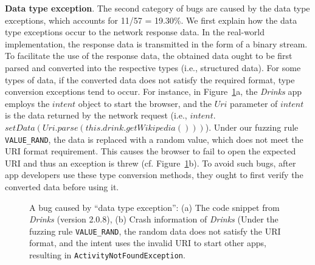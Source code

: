 \documentclass[sigconf,review, anonymous]{acmart}
\begin{document}
\textbf{Data type exception}. The second category of bugs are caused by the data type exceptions, which accounts for 11/57 = 19.30\%. We first explain how the data type exceptions occur to the network response data. In the real-world implementation, the response data is transmitted in the form of a binary stream. To facilitate the use of the response data,  the obtained data ought to be first parsed and converted into the respective types (i.e., structured data). For some types of data, if the converted data does not satisfy the required format, type conversion exceptions tend to occur. For instance, in Figure~\ref{fig_bug2}a, the \textit{Drinks} app employs the $intent$ object to start the browser, and the $Uri$ parameter of $intent$ is the data returned by the network request (i.e., $intent$. $setData(Uri. parse(this.drink.getWikipedia()))$). Under our fuzzing rule \texttt{VALUE\_RAND}, the data is replaced with a random value, which does not meet the URI format requirement. This causes the browser to fail to open the expected URI and thus an exception is threw (cf. Figure~\ref{fig_bug2}b). To avoid such bugs, after app developers use these type conversion methods, they ought to first verify the converted data before using it.

\begin{figure}
  \centering
 \subfigure[]{
    }
  \subfigure[]{
    }
  \caption{A bug caused by ``data type exception'': (a) The code snippet from \textit{Drinks} (version 2.0.8), (b) Crash information of \textit{Drinks} (Under the fuzzing rule \texttt{VALUE\_RAND}, the random data does not satisfy the URI format, and the intent uses the invalid URI to start other apps, resulting in \texttt{ActivityNotFoundException}.}
\label{fig_bug2}
\end{figure}
\end{document}
